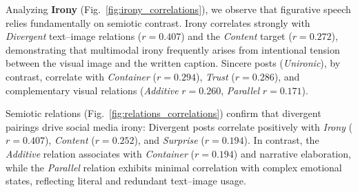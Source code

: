 Analyzing \textbf{Irony} (Fig.~\ref{fig:irony_correlations}), we observe that figurative speech relies fundamentally on semiotic contrast. Irony correlates strongly with \textit{Divergent} text--image relations ($r = 0.407$) and the \textit{Content} target ($r = 0.272$), demonstrating that multimodal irony frequently arises from intentional tension between the visual image and the written caption. Sincere posts (\textit{Unironic}), by contrast, correlate with \textit{Container} ($r = 0.294$), \textit{Trust} ($r = 0.286$), and complementary visual relations (\textit{Additive} $r = 0.260$, \textit{Parallel} $r = 0.171$).

Semiotic relations (Fig.~\ref{fig:relations_correlations}) confirm that divergent pairings drive social media irony: Divergent posts correlate positively with \textit{Irony} ($r = 0.407$), \textit{Content} ($r = 0.252$), and \textit{Surprise} ($r = 0.194$). In contrast, the \textit{Additive} relation associates with \textit{Container} ($r = 0.194$) and narrative elaboration, while the \textit{Parallel} relation exhibits minimal correlation with complex emotional states, reflecting literal and redundant text--image usage.
